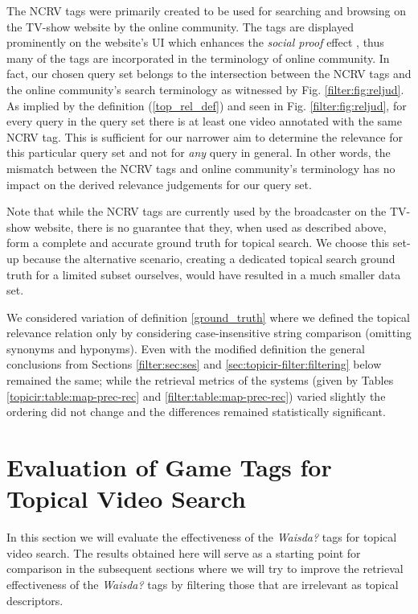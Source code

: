 The NCRV tags were primarily created to be used for searching and browsing on the TV-show website by the online community. The tags are displayed prominently on the website's UI which enhances the \textit{social proof} effect \cite{Floeck:social-proof,golder2006usage}, thus many of the tags are incorporated in the terminology of online community. In fact, our chosen query set belongs to the intersection between the NCRV tags and the online community's search terminology as witnessed by Fig. \ref{filter:fig:reljud}. 
As implied by the definition (\ref{top_rel_def}) and seen in Fig. \ref{filter:fig:reljud}, for every query in the query set there is at least one video annotated with the same NCRV tag.
This is sufficient for our narrower aim to determine the relevance for this particular query set and not for \textit{any} query in general. In other words, the mismatch between the NCRV tags and online community's terminology has no impact on the derived relevance judgements for our query set.

Note that while the NCRV tags are currently used by the broadcaster on the TV-show website, there is no guarantee that they, when used as described above, form a complete and accurate ground truth for topical search. We choose this set-up  because the alternative scenario, creating a dedicated topical search ground truth for a limited subset ourselves, would have resulted in a much smaller data set.

We considered variation of definition \ref{ground_truth} where we defined the topical relevance relation only by considering case-insensitive string comparison (omitting synonyms and hyponyms). Even with the modified definition the general conclusions from Sections  \ref{filter:sec:ses} and \ref{sec:topicir-filter:filtering} below remained the same;  while the retrieval metrics of the systems (given by Tables \ref{topicir:table:map-prec-rec} and \ref{filter:table:map-prec-rec}) varied slightly the ordering did not change and the differences remained statistically significant.

\section{Evaluation of Game Tags for Topical Video Search} \label{sec:topicir-filter:all-tags}
In this section we will evaluate the effectiveness of the \textit{Waisda?} tags for topical video search. The results obtained here will serve as a starting point for comparison in the subsequent sections where we will try to improve the retrieval effectiveness of the \textit{Waisda?} tags by filtering those that are irrelevant as topical descriptors.

